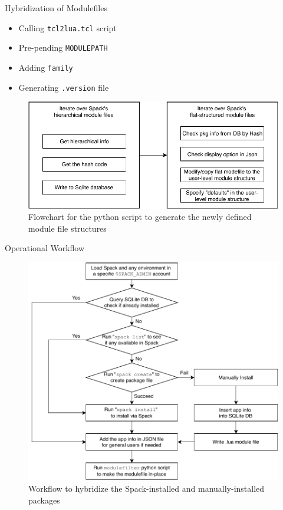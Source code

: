 \documentclass[final]{beamer}
\newlength{\onecolwid}
\begin{document}
\begin{frame}[t]
\begin{columns}[t]
\begin{column}{\onecolwid}
\begin{block}{Hybridization of Modulefiles}
\setlength{\leftmargini}{9.5cm}
\setlength{\leftmarginii}{9.5cm}
\begin{itemize}
    \item Calling \texttt{tcl2lua.tcl} script
    \item Pre-pending \texttt{MODULEPATH} 
    \item Adding \texttt{family} 
    \item Generating \texttt{.version} file
\end{itemize}

\vspace{0.75em}
\begin{figure}
  \centerline{\includegraphics[width=0.8\linewidth]{figures/modulefilter_flowchart}}
  \caption{Flowchart for the python script to generate the newly defined module file structures}
\end{figure}

\end{block}


\vspace{-1em}
\begin{block}{Operational Workflow}

\begin{figure}
  \centerline{\includegraphics[width=0.8\linewidth]{figures/spack_h2_hybrid_flow}}
  \caption{Workflow to hybridize the Spack-installed and manually-installed packages}
\end{figure}



\end{block}
\end{column}
\end{columns}
\end{frame}
\end{document}
